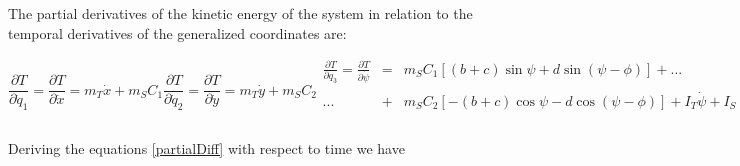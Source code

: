 \documentclass[sublist,a4paper,twoside,11pt]{article}
\begin{document}
The partial derivatives of the kinetic energy of the system in relation to the temporal derivatives of the generalized coordinates are:

\begin{subequations} \label{partialDiff}
\begin{equation}
    \frac{\partial T}{\partial \dot{q}_1} = \frac{\partial T}{\partial \dot{x}} = m_{T} \dot{x} + m_S C_1
\end{equation}
\begin{equation}
    \frac{\partial T}{\partial \dot{q}_2} = \frac{\partial T}{\partial \dot{y}} = m_{T} \dot{y} + m_S C_2
\end{equation}
\begin{eqnarray}
    \nonumber
    \frac{\partial T}{\partial q_3} = \frac{\partial T}{\partial \dot{\psi}} &=& m_S C_1 \left[ \left( b + c \right) \sin \psi + d \sin \left( \psi - \phi \right) \right] + ... \\
    \nonumber
    ... &+& m_S C_2 \left[ - \left( b + c \right) \cos \psi - d \cos \left( \psi - \phi \right) \right] + I_T \dot{\psi} + I_S \left( \dot{\psi} - \dot{\phi} \right) \\
\end{eqnarray}
\begin{equation}
    \frac{\partial T}{\partial q_4} = \frac{\partial T}{\partial \dot{\phi}} = m_S C_1 \left[ - d \sin \left( \psi - \phi \right) \right] + m_S C_2 \left[ d \cos \left( \psi - \phi \right) \right] - I_S \left( \dot{\psi} - \dot{\phi} \right).
\end{equation}
\end{subequations}

Deriving the equations \eqref{partialDiff} with respect to time we have
\end{document}
